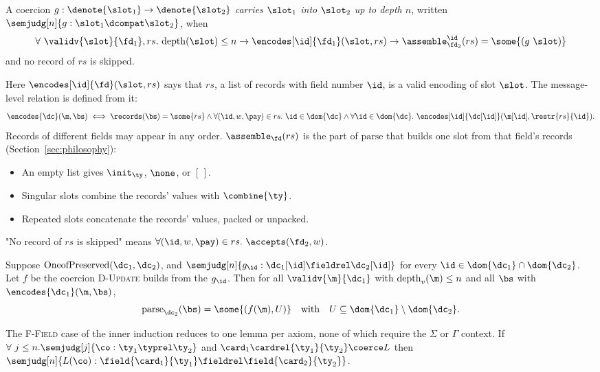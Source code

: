 \vspace{1em}
\begin{definition}\label{def:sem-compat-fld}
  A coercion $g : \denote{\slot_1} \rightarrow \denote{\slot_2}$ \emph{carries $\slot_1$ into $\slot_2$ up
  to depth $n$}, written $\semjudg[n]{g : \slot_1 \dcompat \slot_2}$, when
\[ \forall\ \validv{\slot}{\fd_1}, rs.\ \mathrm{depth}(\slot) \le n \rightarrow \encodes[\id]{\fd_1}(\slot, rs) \rightarrow
  \assemble_{\fd_2}^{\id}(rs) = \some{(g\ \slot)} \]
and no record of $rs$ is skipped.
\end{definition}

Here $\encodes[\id]{\fd}(\slot, rs)$ says that $rs$, a list of records with field
number $\id$, is a valid encoding of slot $\slot$. The message-level relation is
defined from it:
\[
  \encodes{\dc}(\m, \bs) \iff
  \records(\bs) = \some{rs}
  \wedge \forall (\id, w, \pay) \in rs.\ \id \in \dom{\dc}
  \wedge \forall \id \in \dom{\dc}.\ \encodes[\id]{\dc[\id]}(\m[\id], \restr{rs}{\id}).
\]
Records of different fields may appear in any order. $\assemble_{\fd}(rs)$ is the
part of $\mathrm{parse}$ that builds one slot from that field's records
(Section~\ref{sec:philosophy}):
\begin{itemize}
\item An empty list gives $\init_{\ty}$, $\none$, or $[\,]$.
\item Singular slots combine the records' values with $\combine{\ty}$.
\item Repeated slots concatenate the records' values, packed or unpacked.
\end{itemize}
"No record of $rs$ is skipped" means
$\forall (\id, w, \pay) \in rs.\ \accepts(\fd_2, w)$.

\vspace{1em}
\begin{lemma}\label{lem:msg-from-fields}
  Suppose $\mathrm{OneofPreserved}(\dc_1, \dc_2)$, and
  $\semjudg[n]{g_{\id} : \dc_1[\id] \fieldrel \dc_2[\id]}$ for every
  $\id \in \dom{\dc_1} \cap \dom{\dc_2}$. Let $f$ be the coercion
  \textsc{D-Update} builds from the $g_{\id}$. Then for all
  $\validv{\m}{\dc_1}$ with $\mathrm{depth}_v(\m) \le n$ and all $\bs$ with
  $\encodes{\dc_1}(\m, \bs)$,
  \[ \mathrm{parse}_{\dc_2}(\bs) = \some{(f(\m), U)} \quad\text{with}\quad
     U \subseteq \dom{\dc_1} \setminus \dom{\dc_2}. \]
\end{lemma}

The \textsc{F-Field} case of the inner induction reduces to one lemma per axiom,
none of which require the $\Sigma$ or $\Gamma$ context. If
$\forall\ j \le n. \semjudg[j]{\co : \ty_1 \typrel \ty_2}$ and
$\card_1 \cardrel{\ty_1}{\ty_2} \coerce L$ then
$\semjudg[n]{L(\co) : \field{\card_1}{\ty_1} \fieldrel \field{\card_2}{\ty_2}}$.

